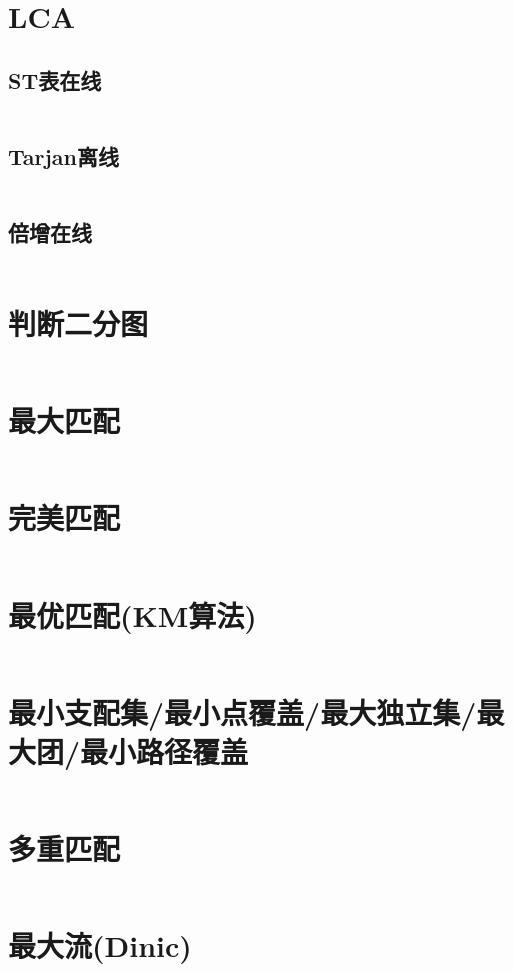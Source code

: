 \documentclass[a4paper,11pt]{article}
\begin{document}
\section*{LCA}
\subsection*{ST表在线}
\inputminted[]{c++}{Template/TreeGraph/LCA-ST.cpp}
\subsection*{Tarjan离线}
\inputminted[]{c++}{Template/TreeGraph/LCA-Tarjan.cpp}
\subsection*{倍增在线}
\inputminted[]{c++}{Template/TreeGraph/LCA-Mul.cpp}

\newpage
\section*{判断二分图}
\inputminted[]{c++}{Template/NetworkFlow/BinaryJudge.cpp}
\section*{最大匹配}
\inputminted[]{c++}{Template/NetworkFlow/MaximumMatch.cpp}
\section*{完美匹配}
\inputminted[]{c++}{Template/NetworkFlow/PerfectMatch.cpp}
\section*{最优匹配(KM算法)}
\inputminted[]{c++}{Template/NetworkFlow/KM.cpp}
\section*{最小支配集/最小点覆盖/最大独立集/最大团/最小路径覆盖}
\inputminted[]{c++}{Template/NetworkFlow/SetPro.cpp}
\section*{多重匹配}
\inputminted[]{c++}{Template/NetworkFlow/MultiMatch.cpp}
\section*{最大流(Dinic)}
\inputminted[]{c++}{Template/NetworkFlow/Dinic.cpp}
\end{document}
